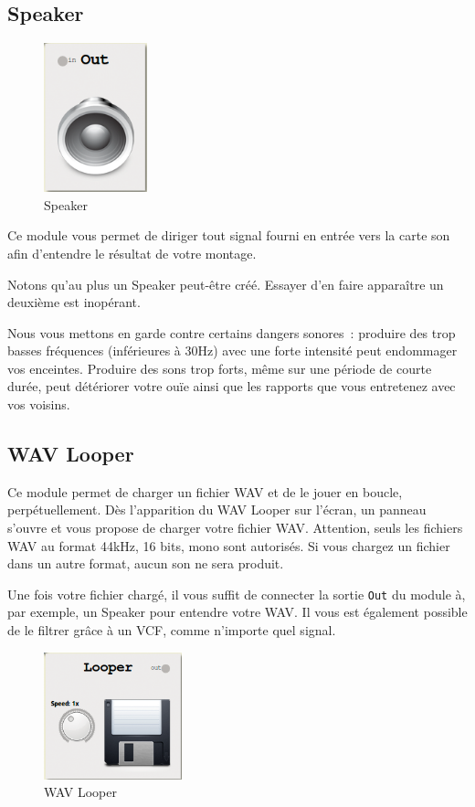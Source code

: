 \documentclass[a4paper,oneside,frenchb,10pt]{article}
\begin{document}
\subsection{Speaker}

\begin{multicols}{2}
\begin{figure}[H]
\centering
\includegraphics[width=3cm]{../img/png/speaker.png}
\caption{Speaker}
\end{figure}

Ce module vous permet de diriger tout signal fourni en entrée vers la
carte son afin d'entendre le résultat de votre montage.

Notons qu'au plus un Speaker peut-être créé. Essayer d'en faire
apparaître un deuxième est inopérant.

Nous vous mettons en garde contre certains dangers sonores~: produire
des trop basses fréquences (inférieures à 30Hz) avec une forte intensité
peut endommager vos enceintes. Produire des sons trop forts, même sur
une période de courte durée, peut détériorer votre ouïe ainsi que les
rapports que vous entretenez avec vos voisins.
\end{multicols}

\subsection{WAV Looper}

\begin{multicols}{2}
Ce module permet de charger un fichier WAV et de le jouer en boucle,
perpétuellement. Dès l'apparition du WAV Looper sur l'écran, un panneau
s'ouvre et vous propose de charger votre fichier WAV. Attention, seuls
les fichiers WAV au format 44kHz, 16 bits, mono sont autorisés. Si vous
chargez un fichier dans un autre format, aucun son ne sera produit.

Une fois votre fichier chargé, il vous suffit de connecter la sortie
\verb!Out! du module à, par exemple, un Speaker pour entendre votre WAV.
Il vous est également possible de le filtrer grâce à un VCF, comme
n'importe quel signal.

\begin{figure}[H]
\centering
\includegraphics[width=4cm]{../img/png/wavlooper.png}
\caption{WAV Looper}
\end{figure}
\end{multicols}
\end{document}
